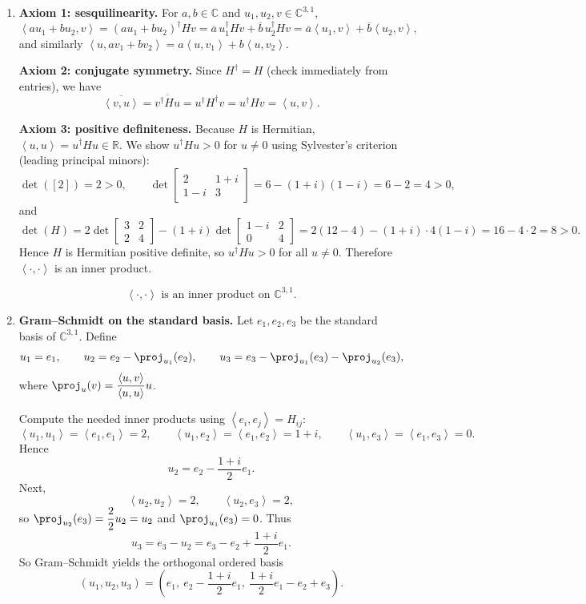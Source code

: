 \documentclass[12pt]{article}
\newcommand{\R}{\mathbb{R}}
\newcommand{\C}{\mathbb{C}}
\newcommand{\ip}[2]{\left\langle #1,#2\right\rangle}
\begin{document}
\begin{enumerate}[label=(\alph*)]
\item \textbf{Axiom 1: sesquilinearity.}
For $a,b\in\C$ and $u_1,u_2,v\in\C^{3,1}$,
\[
\ip{au_1+bu_2}{v}=(au_1+bu_2)^\dagger H v=\overline{a}\,u_1^\dagger Hv+\overline{b}\,u_2^\dagger Hv
=\overline{a}\ip{u_1}{v}+\overline{b}\ip{u_2}{v},
\]
and similarly $\ip{u}{av_1+bv_2}=a\ip{u}{v_1}+b\ip{u}{v_2}$.

\smallskip
\noindent\textbf{Axiom 2: conjugate symmetry.}
Since $H^\dagger=H$ (check immediately from entries), we have
\[
\overline{\ip{v}{u}}=\overline{v^\dagger H u}=u^\dagger H^\dagger v=u^\dagger H v=\ip{u}{v}.
\]

\smallskip
\noindent\textbf{Axiom 3: positive definiteness.}
Because $H$ is Hermitian, $\ip{u}{u}=u^\dagger H u\in\R$.
We show $u^\dagger H u>0$ for $u\neq 0$ using Sylvester's criterion (leading principal minors):
\[
\det([2])=2>0,\qquad
\det\begin{bmatrix}2&1+i\\1-i&3\end{bmatrix}
=6-(1+i)(1-i)=6-2=4>0,
\]
and
\[
\det(H)=2\det\begin{bmatrix}3&2\\2&4\end{bmatrix}-(1+i)\det\begin{bmatrix}1-i&2\\0&4\end{bmatrix}
=2(12-4)- (1+i)\cdot 4(1-i)
=16-4\cdot 2=8>0.
\]
Hence $H$ is Hermitian positive definite, so $u^\dagger H u>0$ for all $u\neq 0$.
Therefore $\ip{\cdot}{\cdot}$ is an inner product.

\[
\boxed{\,\ip{\cdot}{\cdot}\text{ is an inner product on }\C^{3,1}. \,}
\]

\item \textbf{Gram--Schmidt on the standard basis.}
Let $e_1,e_2,e_3$ be the standard basis of $\C^{3,1}$.
Define
\[
u_1=e_1,\qquad
u_2=e_2-\proj_{u_1}(e_2),\qquad
u_3=e_3-\proj_{u_1}(e_3)-\proj_{u_2}(e_3),
\]
where $\proj_{u}(v)=\dfrac{\ip{u}{v}}{\ip{u}{u}}u$.

Compute the needed inner products using $\ip{e_i}{e_j}=H_{ij}$:
\[
\ip{u_1}{u_1}=\ip{e_1}{e_1}=2,\qquad
\ip{u_1}{e_2}=\ip{e_1}{e_2}=1+i,\qquad
\ip{u_1}{e_3}=\ip{e_1}{e_3}=0.
\]
Hence
\[
u_2=e_2-\frac{1+i}{2}e_1.
\]
Next,
\[
\ip{u_2}{u_2}=2,
\qquad
\ip{u_2}{e_3}=2,
\]
so $\proj_{u_2}(e_3)=\dfrac{2}{2}u_2=u_2$ and $\proj_{u_1}(e_3)=0$.
Thus
\[
u_3=e_3-u_2=e_3-e_2+\frac{1+i}{2}e_1.
\]
So Gram--Schmidt yields the orthogonal ordered basis
\[
\boxed{\,
(u_1,u_2,u_3)=\left(e_1,\ e_2-\frac{1+i}{2}e_1,\ \frac{1+i}{2}e_1-e_2+e_3\right).
\,}
\]


\end{enumerate}
\end{document}
